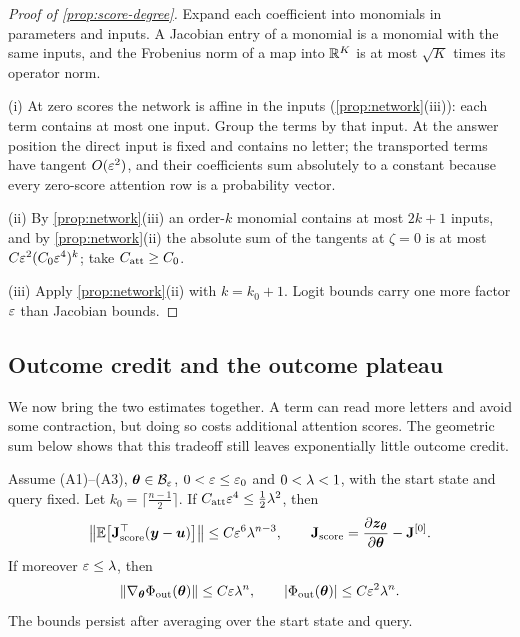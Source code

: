 \begin{proof}[Proof of \cref{prop:score-degree}]
Expand each coefficient into monomials in parameters and inputs. A Jacobian entry of a monomial is a monomial with the same inputs, and the
Frobenius norm of a map into $\mathbb R^K$ is at most $\sqrt K$ times its operator norm.

\noindent(i) At zero scores the network is affine in the inputs (\cref{prop:network}(iii)): each term contains at most one input. Group the terms by
that input. At the answer position the direct input is fixed and contains no letter; the transported terms have tangent $O(\varepsilon^2)$, and
their coefficients sum absolutely to a constant because every zero-score attention row is a probability vector.

\noindent(ii) By \cref{prop:network}(iii) an order-$k$ monomial contains at most $2k+1$ inputs, and by \cref{prop:network}(ii) the absolute sum of the
tangents at $\zeta=0$ is at most $C\varepsilon^2(C_0\varepsilon^4)^k$; take $C_{\mathrm{att}}\ge C_0$.

\noindent(iii) Apply \cref{prop:network}(ii) with $k=k_0+1$. Logit bounds carry one more factor $\varepsilon$ than Jacobian bounds.
\end{proof}

\subsection{Outcome credit and the outcome plateau}
\label{app:thm1}

We now bring the two estimates together. A term can read more letters and avoid some contraction, but doing so costs additional
attention scores. The geometric sum below shows that this tradeoff still leaves exponentially little outcome credit.

\begin{lemma}
\label{lem:score-sum}
Assume (A1)--(A3), $\bm\theta\in\mathcal B_{\varepsilon}$, $0<\varepsilon\le\varepsilon_0$ and $0<\lambda<1$, with the start state and query fixed. Let
$k_0=\lceil\frac{n-1}{2}\rceil$. If $C_{\mathrm{att}}\varepsilon^4\le\frac{1}{2}\lambda^2$, then
\[
 \bigl\|\E\bigl[\mathbf J_{\mathrm{score}}^\top(\bm y-\bm u)\bigr]\bigr\|\le C\initscale^6\mixrate^{n-3},\qquad \mathbf J_{\mathrm{score}}=\Jz-\mathbf J^{[0]}.
\]
If moreover $\varepsilon\le\lambda$, then
\begin{equation}
 \|\nabla_{\bm\theta}\Phi_{\mathrm{out}}(\bm\theta)\|\le C\varepsilon\lambda^n,\qquad |\Phi_{\mathrm{out}}(\bm\theta)|\le C\varepsilon^2\lambda^n.
 \label{eq:thm1-full}
\end{equation}
The bounds persist after averaging over the start state and query.
\end{lemma}

